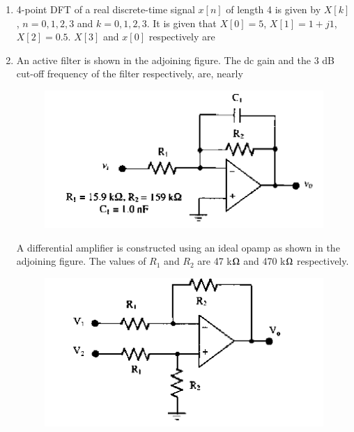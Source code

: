 \documentclass[journal,12pt,onecolumn]{IEEEtran}
\theoremstyle{remark}
\begin{document}
\begin{enumerate}
\newpage

\item 4-point DFT of a real discrete-time signal $x[n]$ of length 4 is given by $X[k]$, $n=0,1,2,3$ and $k=0,1,2,3$. It is given that $X[0]=5$, $X[1]=1+j1$, $X[2]=0.5$. $X[3]$ and $x[0]$ respectively are

\hfill{}
\begin{enumerate}  
\end{enumerate}



\item An active filter is shown in the adjoining figure. The dc gain and the 3 dB cut-off frequency of the filter respectively, are, nearly
\begin{figure}[H]
    \centering
    \includegraphics[width = 0.7\columnwidth]{q47}
    \caption*{}
    \label{Q47}
\end{figure}

\hfill{}
\begin{enumerate} 
\end{enumerate}


A differential amplifier is constructed using an ideal opamp as shown in the adjoining figure. The values of $R_1$ and $R_2$ are 47 k$\ohm$ and 470 k$\ohm$ respectively.
\begin{figure}[H]
    \centering
    \includegraphics[width = 0.7\columnwidth]{q48}
    \caption*{}
    \label{Q48}
\end{figure}



\end{enumerate}
\end{document}
